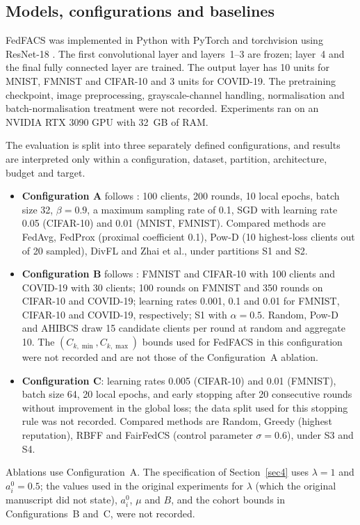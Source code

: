 \documentclass[pdflatex,sn-basic]{sn-jnl}
\begin{document}
\subsection{Models, configurations and baselines}\label{sec5.2}
FedFACS was implemented in Python with PyTorch and torchvision using ResNet-18 \citep{he2016}. The first convolutional layer and layers~1--3 are frozen; layer~4 and the final fully connected layer are trained. The output layer has 10 units for MNIST, FMNIST and CIFAR-10 and 3 units for COVID-19. The pretraining checkpoint, image preprocessing, grayscale-channel handling, normalisation and batch-normalisation treatment were not recorded. Experiments ran on an NVIDIA RTX 3090 GPU with 32~GB of RAM.

The evaluation is split into three separately defined configurations, and results are interpreted only within a configuration, dataset, partition, architecture, budget and target.
\begin{itemize}
\item \textbf{Configuration A} follows \citet{zhai2024}: 100 clients, 200 rounds, 10 local epochs, batch size 32, $\beta=0.9$, a maximum sampling rate of 0.1, SGD with learning rate 0.05 (CIFAR-10) and 0.01 (MNIST, FMNIST). Compared methods are FedAvg, FedProx (proximal coefficient 0.1), Pow-D (10 highest-loss clients out of 20 sampled), DivFL and Zhai et al., under partitions S1 and S2.
\item \textbf{Configuration B} follows \citet{liu2025}: FMNIST and CIFAR-10 with 100 clients and COVID-19 with 30 clients; 100 rounds on FMNIST and 350 rounds on CIFAR-10 and COVID-19; learning rates 0.001, 0.1 and 0.01 for FMNIST, CIFAR-10 and COVID-19, respectively; S1 with $\alpha=0.5$. Random, Pow-D and AHIBCS draw 15 candidate clients per round at random and aggregate 10. The $(C_{k,\min},C_{k,\max})$ bounds used for FedFACS in this configuration were not recorded and are not those of the Configuration~A ablation.
\item \textbf{Configuration C}: learning rates 0.005 (CIFAR-10) and 0.01 (FMNIST), batch size 64, 20 local epochs, and early stopping after 20 consecutive rounds without improvement in the global loss; the data split used for this stopping rule was not recorded. Compared methods are Random, Greedy (highest reputation), RBFF \citep{song2022} and FairFedCS \citep{shi2023} (control parameter $\sigma=0.6$), under S3 and S4.
\end{itemize}
Ablations use Configuration~A. The specification of Section~\ref{sec4} uses $\lambda=1$ and $a_i^0=0.5$; the values used in the original experiments for $\lambda$ (which the original manuscript did not state), $a_i^0$, $\mu$ and $B$, and the cohort bounds in Configurations~B and~C, were not recorded.
\end{document}
